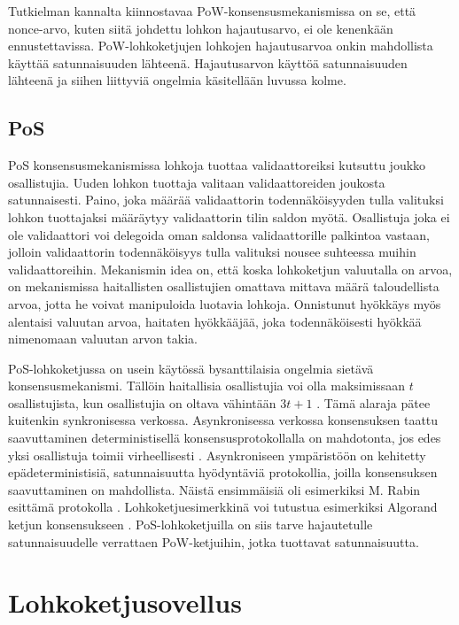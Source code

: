 Tutkielman kannalta kiinnostavaa PoW-konsensusmekanismissa on se, että nonce-arvo, kuten siitä johdettu lohkon hajautusarvo, ei ole kenenkään ennustettavissa. PoW-lohkoketjujen lohkojen hajautusarvoa onkin mahdollista käyttää satunnaisuuden lähteenä. Hajautusarvon käyttöä satunnaisuuden lähteenä ja siihen liittyviä ongelmia käsitellään luvussa kolme.

\subsection{PoS}

PoS konsensusmekanismissa lohkoja tuottaa validaattoreiksi kutsuttu joukko osallistujia. Uuden lohkon tuottaja valitaan validaattoreiden joukosta satunnaisesti. Paino, joka määrää validaattorin todennäköisyyden tulla valituksi lohkon tuottajaksi määräytyy validaattorin tilin saldon myötä. Osallistuja joka ei ole validaattori voi delegoida oman saldonsa validaattorille palkintoa vastaan, jolloin validaattorin todennäköisyys tulla valituksi nousee suhteessa muihin validaattoreihin. Mekanismin idea on, että koska lohkoketjun valuutalla on arvoa, on mekanismissa haitallisten osallistujien omattava mittava määrä taloudellista arvoa, jotta he voivat manipuloida luotavia lohkoja. Onnistunut hyökkäys myös alentaisi valuutan arvoa, haitaten hyökkääjää, joka todennäköisesti hyökkää nimenomaan valuutan arvon takia.

PoS-lohkoketjussa on usein käytössä bysanttilaisia ongelmia sietävä konsensusmekanismi. Tällöin haitallisia osallistujia voi olla maksimissaan $t$ osallistujista, kun osallistujia on oltava vähintään $3t + 1$ \cite{10.1145/322186.322188}. Tämä alaraja pätee kuitenkin synkronisessa verkossa. Asynkronisessa verkossa konsensuksen taattu saavuttaminen deterministisellä konsensusprotokollalla on mahdotonta, jos edes yksi osallistuja toimii virheellisesti \cite{fischer_impossibility_1985}. Asynkroniseen ympäristöön on kehitetty epädeterministisiä, satunnaisuutta hyödyntäviä protokollia, joilla konsensuksen saavuttaminen on mahdollista. Näistä ensimmäisiä oli esimerkiksi M. Rabin esittämä protokolla \cite{10.1109/SFCS.1983.48}. Lohkoketjuesimerkkinä voi tutustua esimerkiksi Algorand ketjun konsensukseen \cite{gilad_algorand_2017}\textbf{}. PoS-lohkoketjuilla on siis tarve hajautetulle satunnaisuudelle verrattaen PoW-ketjuihin, jotka tuottavat satunnaisuutta. 

\section{Lohkoketjusovellus}

